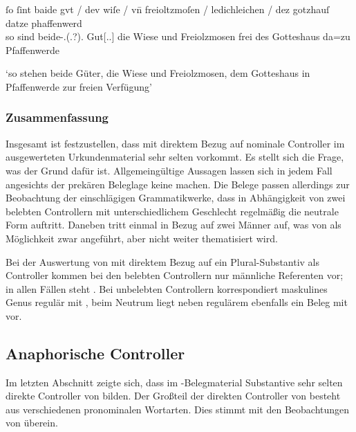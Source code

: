 \begin{exe}
\ex\label{ex:1584_gut}
	\gll ſo ſint baide gvt / dev wiſe / vn̄ freioltzmoſen /
			ledichleichen / dez gotzhauſ datze phaffenwerd \\
		so sind beide-\Nom.\Pl(.\N\subI?).\St{} Gut[\Nom.\Pl.\NeutI] {} die
			Wiese {} und Freiolzmosen {} frei {} des Gotteshaus da=zu
			Pfaffenwerde \\
	\begin{taggedline}{\parencites(Kl.~Herrenchiemsee, Kr.~Rosenheim, 1292)[\pno~1584, 727.26--27]{cao2}}
		\trans `so stehen beide Güter, die Wiese und Freiolzmosen, dem
		Gotteshaus in Pfaffenwerde zur freien Verfügung'
	\end{taggedline}
\end{exe}

\subsubsection{Zusammenfassung}

Insgesamt ist festzustellen, dass  mit direktem Bezug auf
nominale Controller im ausgewerteten Urkundenmaterial sehr selten vorkommt. Es
stellt sich die Frage, was der Grund dafür ist. Allgemeingültige Aussagen
lassen sich in jedem Fall angesichts der prekären Beleglage keine machen. Die
Belege passen allerdings zur Beobachtung der einschlägigen Grammatikwerke, dass
in Abhängigkeit von zwei belebten Controllern mit unterschiedlichem Geschlecht
regelmäßig die neutrale Form  auftritt. Daneben tritt
 einmal in Bezug auf zwei Männer auf, was von
\textcite[384]{paul2007} als Möglichkeit zwar angeführt, aber nicht weiter
thematisiert wird.

Bei der Auswertung von  mit direktem Bezug auf ein
Plural-Substantiv als Controller kommen bei den belebten Controllern nur
männliche Referenten vor; in allen Fällen steht . Bei unbelebten
Controllern korrespondiert maskulines Genus regulär mit , beim
Neutrum liegt neben regulärem  ebenfalls ein Beleg mit
 vor.

\subsection{Anaphorische Controller}
\label{subsec:refctrl}

Im letzten Abschnitt zeigte sich, dass im \CAO{}-Belegmaterial
Substantive sehr selten direkte Controller von  bilden. Der
Großteil der direkten Controller von  besteht aus verschiedenen
pronominalen Wortarten.
Dies stimmt mit den Beobachtungen von \citet[624--625]{ksw2} überein.

